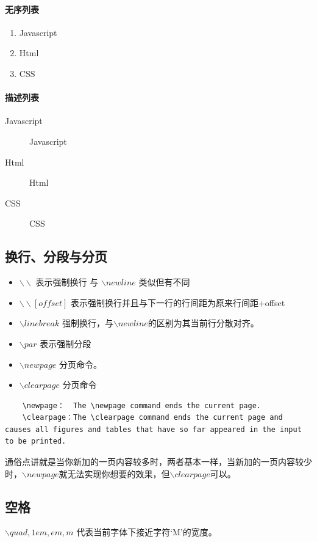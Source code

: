 \paragraph{无序列表}
\begin{enumerate}
  \item Javascript
  \item Html
  \item CSS
\end{enumerate}

\paragraph{描述列表}
\begin{description}
  \item[Javascript] Javascript
  \item[Html] Html
  \item[CSS] CSS
\end{description}

\subsection{换行、分段与分页}
\begin{itemize}
    \item $\backslash \backslash$ 表示强制换行 与 $\backslash newline$ 类似但有不同
    \item $\backslash \backslash[offset]$ 表示强制换行并且与下一行的行间距为原来行间距+offset
    \item $\backslash linebreak$ 强制换行，与$\backslash newline$的区别为其当前行分散对齐。
    \item $\backslash par$ 表示强制分段
    \item $\backslash newpage$ 分页命令。
    \item $\backslash clearpage$ 分页命令
\end{itemize}

\begin{lstlisting}
    \newpage：  The \newpage command ends the current page.
    \clearpage：The \clearpage command ends the current page and causes all figures and tables that have so far appeared in the input to be printed.
\end{lstlisting}

通俗点讲就是当你新加的一页内容较多时，两者基本一样，当新加的一页内容较少时，$\backslash newpage$就无法实现你想要的效果，但$\backslash clearpage$可以。


\subsection{空格}
$\backslash quad, 1em, em, m$ 代表当前字体下接近字符‘M’的宽度。

